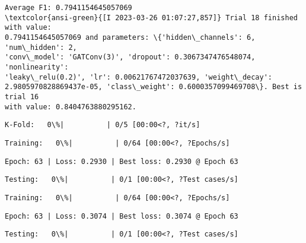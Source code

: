 \documentclass[11pt]{article}
\begin{document}
    
    \begin{Verbatim}[commandchars=\\\{\}]
Average F1: 0.7941154645057069
\textcolor{ansi-green}{[I 2023-03-26 01:07:27,857]} Trial 18 finished with value:
0.7941154645057069 and parameters: \{'hidden\_channels': 6, 'num\_hidden': 2,
'conv\_model': 'GATConv(3)', 'dropout': 0.3067347476548074, 'nonlinearity':
'leaky\_relu(0.2)', 'lr': 0.00621767472037639, 'weight\_decay':
2.9805970828869437e-05, 'class\_weight': 0.6000357099469708\}. Best is trial 16
with value: 0.8404763880295162.
    \end{Verbatim}

    
    \begin{Verbatim}[commandchars=\\\{\}]
K-Fold:   0\%|          | 0/5 [00:00<?, ?it/s]
    \end{Verbatim}

    
    
    \begin{Verbatim}[commandchars=\\\{\}]
Training:   0\%|          | 0/64 [00:00<?, ?Epochs/s]
    \end{Verbatim}

    
    \begin{Verbatim}[commandchars=\\\{\}]
Epoch: 63 | Loss: 0.2930 | Best loss: 0.2930 @ Epoch 63
    \end{Verbatim}

    
    \begin{Verbatim}[commandchars=\\\{\}]
Testing:   0\%|          | 0/1 [00:00<?, ?Test cases/s]
    \end{Verbatim}

    
    
    \begin{Verbatim}[commandchars=\\\{\}]
Training:   0\%|          | 0/64 [00:00<?, ?Epochs/s]
    \end{Verbatim}

    
    \begin{Verbatim}[commandchars=\\\{\}]
Epoch: 63 | Loss: 0.3074 | Best loss: 0.3074 @ Epoch 63
    \end{Verbatim}

    
    \begin{Verbatim}[commandchars=\\\{\}]
Testing:   0\%|          | 0/1 [00:00<?, ?Test cases/s]
    \end{Verbatim}
\end{document}
